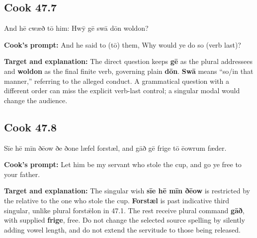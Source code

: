 \par\begin{minipage}{\linewidth}\raggedright
\subsection*{Cook 47.7}

And hē cwæð tō him: Hwȳ gē swā dōn woldon?

\textbf{Cook’s prompt:} And he said to (tō) them, Why would ye do so (verb last)?

\textbf{Target and explanation:} The direct question keeps \textbf{gē} as the plural addressees and \textbf{woldon} as the final finite verb, governing plain \textbf{dōn}. \textbf{Swā} means “so/\allowbreak{}in that manner,” referring to the alleged conduct. A grammatical question with a different order can miss the explicit verb-last control; a singular modal would change the audience.

\end{minipage}\par\addvspace{4pt}

\par\begin{minipage}{\linewidth}\raggedright
\subsection*{Cook 47.8}

Sīe hē mīn ðēow ðe ðone læfel forstæl, and gāð gē frige tō ēowrum fæder.

\textbf{Cook’s prompt:} Let him be my servant who stole the cup, and go ye free to your father.

\textbf{Target and explanation:} The singular wish \textbf{sīe hē mīn ðēow} is restricted by the relative to the one who stole the cup. \textbf{Forstæl} is past indicative third singular, unlike plural forstǣlon in 47.1. The rest receive plural command \textbf{gāð}, with supplied \textbf{frige}, free. Do not change the selected source spelling by silently adding vowel length, and do not extend the servitude to those being released.

\end{minipage}\par\addvspace{4pt}

